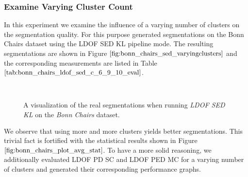 \subsubsection{Examine Varying Cluster Count}
\label{sec:varying_cluster_exp}
In this experiment we examine the influence of a varying number of clusters on the segmentation quality. For this purpose generated segmentations on the Bonn Chairs dataset using the LDOF SED KL pipeline mode. The resulting segmentations are shown in Figure $\ref{fig:bonn_chairs_sed_varyingclusters}$ and the corresponding measurements are listed in Table $\ref{tab:bonn_chairs_ldof_sed_c_6_9_10_eval}$.
\begin{figure}[H]
\begin{center}
~
~
\end{center}
\caption[Bonn Chairs SED Segmentations for Varying Cluster Count]{A visualization of the real segmentations when running \textit{LDOF SED KL} on the \textit{Bonn Chairs} dataset.}
\label{fig:bonn_chairs_sed_varyingclusters}
\end{figure}
We observe that using more and more clusters yields better segmentations. This trivial fact is fortified with the statistical results shown in Figure $\ref{fig:bonn_chairs_plot_avg_stat}$. To have a more solid reasoning, we additionally evaluated LDOF PD SC and LDOF PED MC for a varying number of clusters and generated their corresponding performance graphs.
